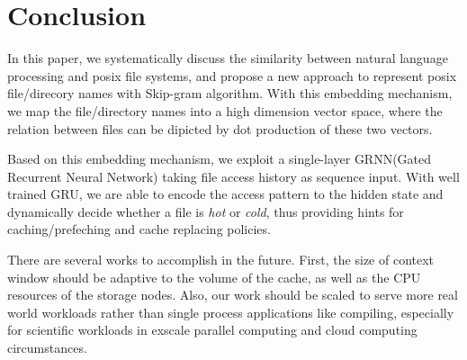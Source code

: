 \documentclass[conference]{IEEEtran}
\begin{document}
\section{Conclusion}
In this paper, we systematically discuss the similarity between natural language processing and posix file systems,
and propose a new approach to represent posix file/direcory names with Skip-gram algorithm. 
With this embedding mechanism, we map the file/directory names into a high dimension vector space, 
where the relation between files can be dipicted by dot production of these two vectors.  

Based on this embedding mechanism, we exploit a single-layer GRNN(Gated Recurrent Neural Network) taking file access history as sequence input.
With well trained GRU, we are able to encode the access pattern to the hidden state and dynamically decide whether a file is \textit{hot} or \textit{cold},
thus providing hints for caching/prefeching and cache replacing policies.

There are several works to accomplish in the future. First, the size of context window should be adaptive to the volume of the cache, 
as well as the CPU resources of the storage nodes.
Also, our work should be scaled to serve more real world workloads rather than single process applications like compiling, 
especially for scientific workloads in exscale parallel computing and cloud computing circumstances.


\end{document}
